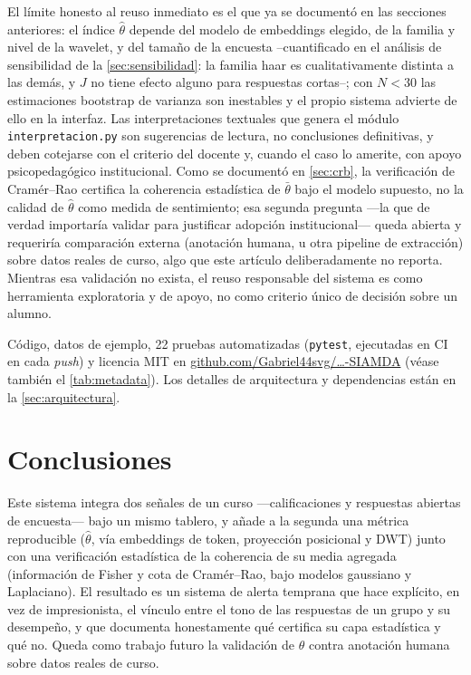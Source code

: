 \documentclass[11pt,a4paper,oneside]{article}
\theoremstyle{definition}
\begin{document}
El límite honesto al reuso inmediato es el que ya se documentó en las secciones anteriores: el
índice $\hat\theta$ depende del modelo de embeddings elegido, de la familia y nivel de la
wavelet, y del tamaño de la encuesta --cuantificado en el análisis de sensibilidad de la
\cref{sec:sensibilidad}: la familia haar es cualitativamente distinta a las demás, y $J$ no tiene
efecto alguno para respuestas cortas--; con $N<30$ las estimaciones bootstrap de varianza son
inestables y el propio sistema advierte de ello en la interfaz. Las interpretaciones textuales
que genera el módulo \texttt{interpretacion.py} son sugerencias de lectura, no conclusiones
definitivas, y deben cotejarse con el criterio del docente y, cuando el caso lo amerite, con
apoyo psicopedagógico institucional. Como se documentó en \cref{sec:crb}, la verificación de
Cramér--Rao certifica la coherencia estadística de $\bar\theta$ bajo el modelo supuesto, no la
calidad de $\hat\theta$ como medida de sentimiento; esa segunda pregunta —la que de verdad
importaría validar para justificar adopción institucional— queda abierta y requeriría
comparación externa (anotación humana, u otra pipeline de extracción) sobre datos reales de
curso, algo que este artículo deliberadamente no reporta. Mientras esa validación no exista, el
reuso responsable del sistema es como herramienta exploratoria y de apoyo, no como criterio
único de decisión sobre un alumno.

\begin{implBox}[title=Reuso]
Código, datos de ejemplo, 22 pruebas automatizadas (\texttt{pytest}, ejecutadas en CI en cada
\emph{push}) y licencia MIT en
\href{https://github.com/Gabriel44svg/Galindo-C.-J.-y-Villafuerte-C.-G.-2026-.-SIAMDA}{github.com/Gabriel44svg/\ldots-SIAMDA}
(véase también el \cref{tab:metadata}). Los detalles de arquitectura y dependencias están en la
\cref{sec:arquitectura}.
\end{implBox}

\section{Conclusiones}

Este sistema integra dos señales de un curso —calificaciones y respuestas abiertas de
encuesta— bajo un mismo tablero, y añade a la segunda una métrica reproducible ($\hat\theta$,
vía embeddings de token, proyección posicional y DWT) junto con una verificación estadística de
la coherencia de su media agregada (información de Fisher y cota de Cramér--Rao, bajo modelos
gaussiano y Laplaciano). El resultado es un sistema de alerta temprana que hace explícito, en
vez de impresionista, el vínculo entre el tono de las respuestas de un grupo y su desempeño, y
que documenta honestamente qué certifica su capa estadística y qué no. Queda como trabajo futuro
la validación de $\hat\theta$ contra anotación humana sobre datos reales de curso.
\end{document}

